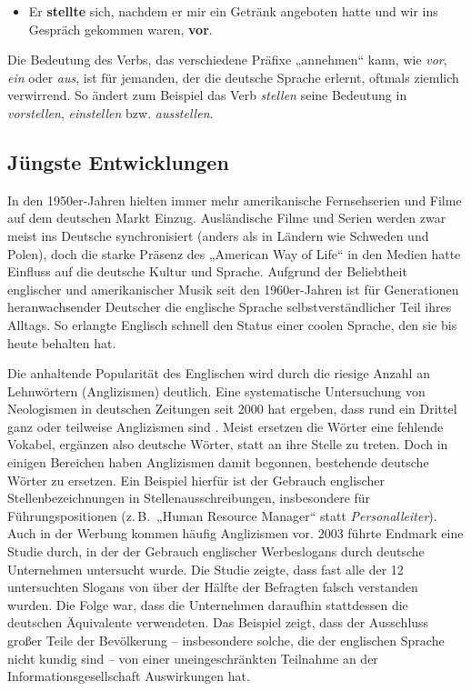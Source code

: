 \documentclass[]{../../metanetpaper}
\begin{document}
\begin{multicols}{2}
\begin{itemize}    
\item Er \textbf{stellte} sich, nachdem er mir ein Getränk angeboten hatte und wir ins Gespräch gekommen waren, \textbf{vor}. 
\end{itemize}
 
Die Bedeutung des Verbs, das verschiedene Präfixe „annehmen“ kann, wie \textit{vor}, \textit{ein} oder \textit{aus}, ist für jemanden, der die deutsche Sprache erlernt, oftmals ziemlich verwirrend. So ändert zum Beispiel das Verb \textit{stellen} seine Bedeutung in \textit{vorstellen}, \textit{einstellen} bzw. \textit{ausstellen}.


\subsection{Jüngste Entwicklungen}

In den 1950er-Jahren hielten immer mehr amerikanische Fernsehserien und Filme auf dem deutschen Markt Einzug. Ausländische Filme und Serien werden zwar meist ins Deutsche synchronisiert (anders als in Ländern wie Schweden und Polen), doch die starke Präsenz des „American Way of Life“ in den Medien hatte Einfluss auf die deutsche Kultur und Sprache. Aufgrund der Beliebtheit englischer und amerikanischer Musik seit den 1960er-Jahren ist für Generationen heranwachsender Deutscher die englische Sprache selbstverständlicher Teil ihres Alltags. So erlangte Englisch schnell den Status einer coolen Sprache, den sie bis heute behalten hat. 

Die anhaltende Popularität des Englischen wird durch die riesige Anzahl an Lehnwörtern (Anglizismen) deutlich. Eine systematische Untersuchung von Neologismen in deutschen Zeitungen seit 2000 hat ergeben, dass rund ein Drittel ganz oder teilweise Anglizismen sind \cite{Lemni1}. Meist ersetzen die Wörter eine fehlende Vokabel, ergänzen also deutsche Wörter, statt an ihre Stelle zu treten. Doch in einigen Bereichen haben Anglizismen damit begonnen, bestehende deutsche Wörter zu ersetzen. Ein Beispiel hierfür ist der Gebrauch englischer Stellenbezeichnungen in Stellenausschreibungen, insbesondere für Führungspositionen (z.\,B.~„Human Resource Manager“ statt \textit{Personalleiter}). Auch in der Werbung kommen häufig Anglizismen vor. 2003 führte Endmark eine Studie durch, in der der Gebrauch englischer Werbeslogans durch deutsche Unternehmen untersucht wurde. Die Studie zeigte, dass fast alle der 12 untersuchten Slogans von über der Hälfte der Befragten falsch verstanden wurden. Die Folge war, dass die Unternehmen daraufhin stattdessen die deutschen Äquivalente verwendeten. Das Beispiel zeigt, dass der Ausschluss großer Teile der Bevölkerung -- insbesondere solche, die der englischen Sprache nicht kundig sind -- von einer uneingeschränkten Teilnahme an der Informationsgesellschaft Auswirkungen hat.


\end{multicols}
\end{document}

